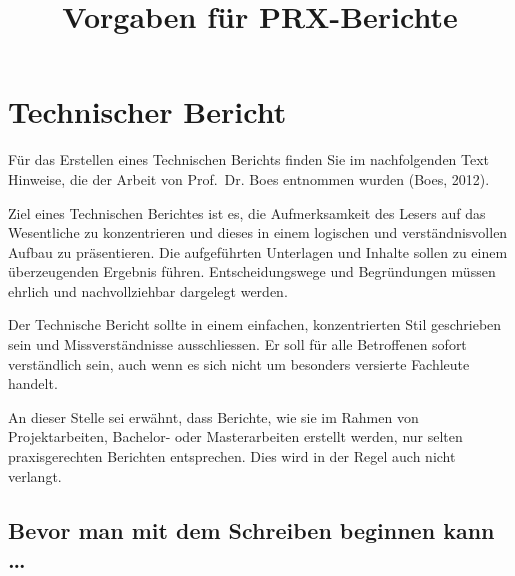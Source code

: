 \documentclass[
]{agujournal2019}
\begin{document}
\title{Vorgaben für PRX-Berichte}









\section{Technischer Bericht}\label{technischer-bericht}

Für das Erstellen eines Technischen Berichts finden Sie im nachfolgenden
Text Hinweise, die der Arbeit von Prof.~Dr. Boes entnommen wurden (Boes,
2012).

Ziel eines Technischen Berichtes ist es, die Aufmerksamkeit des Lesers
auf das Wesentliche zu konzentrieren und dieses in einem logischen und
verständnisvollen Aufbau zu präsentieren. Die aufgeführten Unterlagen
und Inhalte sollen zu einem überzeugenden Ergebnis führen.
Entscheidungswege und Begründungen müssen ehrlich und nachvollziehbar
dargelegt werden.

Der Technische Bericht sollte in einem einfachen, konzentrierten Stil
geschrieben sein und Missverständnisse ausschliessen. Er soll für alle
Betroffenen sofort verständlich sein, auch wenn es sich nicht um
besonders versierte Fachleute handelt.

An dieser Stelle sei erwähnt, dass Berichte, wie sie im Rahmen von
Projektarbeiten, Bachelor- oder Masterarbeiten erstellt werden, nur
selten praxisgerechten Berichten entsprechen. Dies wird in der Regel
auch nicht verlangt.

\subsection{Bevor man mit dem Schreiben beginnen kann
\ldots{}}\label{bevor-man-mit-dem-schreiben-beginnen-kann}
\end{document}

